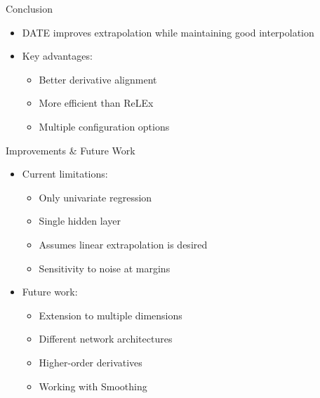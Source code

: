 \documentclass{beamer}
\begin{document}
\begin{frame}{Conclusion}
    \begin{itemize}
        \item DATE improves extrapolation while maintaining good interpolation
        \item Key advantages:
        \begin{itemize}
            \item Better derivative alignment
            \item More efficient than ReLEx
            \item Multiple configuration options
        \end{itemize}
    
    \end{itemize}
\end{frame}


\begin{frame}{Improvements \& Future Work}
    \begin{itemize}
        \item Current limitations:
        \begin{itemize}
            \item Only univariate regression
            \item Single hidden layer
            \item Assumes linear extrapolation is desired
            \item Sensitivity to noise at margins
        \end{itemize}
        \item Future work:
        \begin{itemize}
            \item Extension to multiple dimensions
            \item Different network architectures
            \item Higher-order derivatives
            \item Working with Smoothing
        \end{itemize}
    \end{itemize}
\end{frame}
\end{document}
